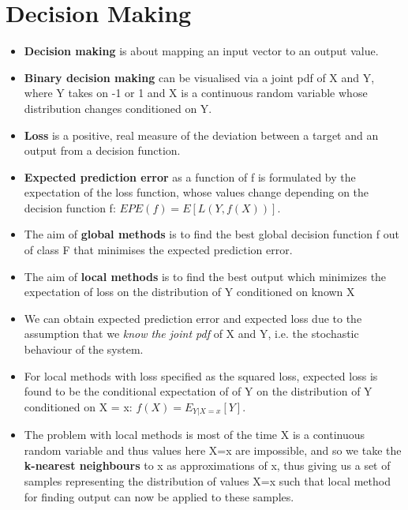 \documentclass[english]{latex4ei/latex4ei_sheet}
\begin{document}

\newpage
\section{Decision Making}
\begin{sectionbox}
\begin{itemize}
\item \textbf{Decision making} is about mapping an input vector to an output value.
\item \textbf{Binary decision making} can be visualised via a joint pdf of X and Y, where Y takes on -1 or 1 and X  is a continuous random variable whose distribution changes conditioned on Y.
\item \textbf{Loss} is a positive, real measure of the deviation between a target and an output from a decision function.
\item \textbf{Expected prediction error} as a function of f is formulated by the expectation of the loss function, whose values change depending on the decision function f: $EPE(f)=E[L(Y, f(X))]$.
\item The aim of \textbf{global methods} is to find the best global decision function f out of class F that minimises the expected prediction error.
\item The aim of \textbf{local methods} is to find the best output which minimizes the expectation of loss on the distribution of Y conditioned on known X
\item We can obtain expected prediction error and expected loss due to the assumption that we \emph{know the joint pdf} of X and Y, i.e. the stochastic behaviour of the system.
\item For local methods with loss specified as the squared loss, expected loss is found to be the conditional expectation of of Y on the distribution of Y conditioned on X = x: $f(X)=E_{Y|X=x}[Y]$.
\item The problem with local methods is most of the time X is a continuous random variable and thus values here X=x are impossible, and so we take the \textbf{k-nearest neighbours} to x as approximations of x, thus giving us a set of samples representing the distribution of values X=x such that local method for finding output can now be applied to these samples.
\end{itemize}
\end{sectionbox}
\end{document}
